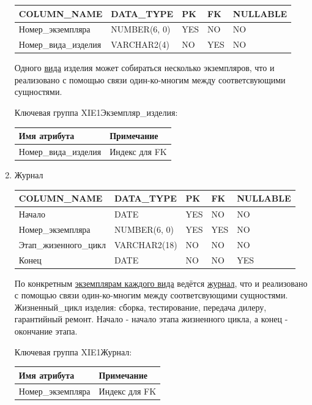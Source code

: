 \begin{enumerate}
    \begin{tabular}{|p{7cm}|p{3cm}|p{1cm}|p{1cm}|p{3cm}|} \hline

        {\bf COLUMN\_NAME} & {\bf DATA\_TYPE} & {\bf PK} & {\bf FK} & {\bf NULLABLE} \\ \hline
        Номер\_экземпляра & NUMBER(6, 0) & YES & NO & NO \\ \hline
        Номер\_вида\_изделия & VARCHAR2(4) & NO & YES & NO \\ \hline

    \end{tabular}

    Одного \underline{вида} изделия может собираться несколько экземпляров, что и реализовано с помощью связи один-ко-многим между соответсвующими сущностями.

    Ключевая группа XIE1Экземпляр\_изделия:

    \begin{tabular}{|p{7cm}|p{9.3cm}|} \hline

        {\bf Имя атрибута} & {\bf Примечание} \\ \hline
        Номер\_вида\_изделия & Индекс для FK \\ \hline

    \end{tabular}

    \item{Журнал}

    \begin{tabular}{|p{7cm}|p{3cm}|p{1cm}|p{1cm}|p{3cm}|} \hline

        {\bf COLUMN\_NAME} & {\bf DATA\_TYPE} & {\bf PK} & {\bf FK} & {\bf NULLABLE} \\ \hline
        Начало & DATE & YES & NO & NO \\ \hline
        Номер\_экземпляра & NUMBER(6, 0) & YES & YES & NO \\ \hline
        Этап\_жизенного\_цикл & VARCHAR2(18) & NO & NO & NO \\ \hline
        Конец & DATE & NO & NO & YES \\ \hline

    \end{tabular}

    По конкретным \underline{экземплярам каждого вида} ведётся \underline{журнал}, что и реализовано с помощью связи один-ко-многим между соответсвующими сущностями.
    Жизненный\_цикл изделия: сборка, тестирование, передача дилеру, гарантийный ремонт.
    Начало - начало этапа жизненного цикла, а конец - окончание этапа.

    Ключевая группа XIE1Журнал:

    \begin{tabular}{|p{7cm}|p{9.3cm}|} \hline

        {\bf Имя атрибута} & {\bf Примечание} \\ \hline
        Номер\_экземпляра & Индекс для FK \\ \hline

    \end{tabular}

\end{enumerate}

